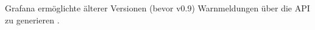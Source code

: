 Grafana ermöglichte älterer Versionen (bevor v0.9) Warnmeldungen über die \gls{API} zu generieren \citep{Grafana_AlertLegacyApi}.


